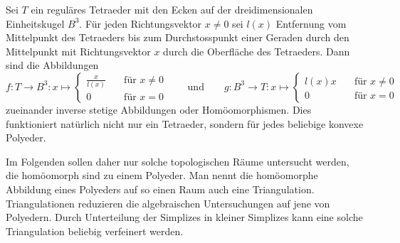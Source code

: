 \begin{beispiel}
\label{buch:homologie:projektion}
Sei $T$ ein reguläres Tetraeder mit den Ecken auf der dreidimensionalen
Einheitskugel $B^3$.
Für jeden Richtungsvektor $x\ne 0$ sei $l(x)$ Entfernung vom Mittelpunkt des
Tetraeders bis zum Durchstosspunkt einer Geraden durch den Mittelpunkt
mit Richtungsvektor $x$ durch die Oberfläche des Tetraeders.
Dann sind die Abbildungen
\[
f\colon
T\to B^3
:
x \mapsto\begin{cases}
\displaystyle
\frac{x}{l(x)}&\quad\text{für $x\ne 0$}\\
0&\quad\text{für $x=0$}
\end{cases}
\qquad\text{und}\qquad
g\colon
B^3\to T
:
x \mapsto\begin{cases}
l(x) x&\quad\text{für $x\ne 0$}\\
0&\quad\text{für $x=0$}
\end{cases}
\]
zueinander inverse stetige Abbildungen oder Homöomorphismen.
Dies funktioniert natürlich nicht nur ein Tetraeder, sondern für jedes
beliebige konvexe Polyeder.
\end{beispiel}

Im Folgenden sollen daher nur solche topologischen Räume untersucht werden,
die homöomorph sind zu einem Polyeder.
Man nennt die homöomorphe Abbildung eines Polyeders auf so einen Raum
auch eine Triangulation.
Triangulationen reduzieren die algebraischen Untersuchungen auf jene
von Polyedern.
Durch Unterteilung der Simplizes in kleiner Simplizes kann eine solche
Triangulation beliebig verfeinert werden.






